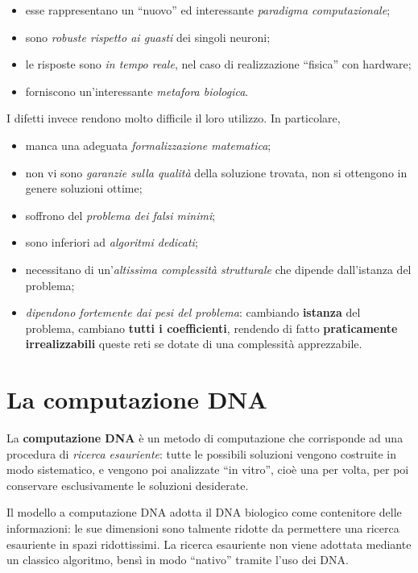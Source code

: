 \documentclass[10pt]{book}
\begin{document}
\begin{itemize}
    \item esse rappresentano un ``nuovo'' ed interessante \emph{paradigma
        computazionale};
    \item sono \emph{robuste rispetto ai guasti} dei singoli neuroni;
    \item le risposte sono \emph{in tempo reale}, nel caso di realizzazione ``fisica''
        con hardware;
    \item forniscono un'interessante \emph{metafora biologica}.
\end{itemize}

I difetti invece rendono molto difficile il loro utilizzo. In particolare,
\begin{itemize}
    \item manca una adeguata \emph{formalizzazione matematica};
    \item non vi sono \emph{garanzie sulla qualità} della soluzione trovata,
        non si ottengono in genere soluzioni ottime;
    \item soffrono del \emph{problema dei falsi minimi};
    \item sono inferiori ad \emph{algoritmi dedicati};
    \item necessitano di un'\emph{altissima complessità strutturale} che
        dipende dall'istanza del problema;
    \item \emph{dipendono fortemente dai pesi del problema}: cambiando
        \textbf{istanza} del problema, cambiano \textbf{tutti i coefficienti},
        rendendo di fatto \textbf{praticamente irrealizzabili} queste reti se
        dotate di una complessità apprezzabile.
\end{itemize}


\chapter{La computazione DNA}

La \textbf{computazione DNA} è un metodo di computazione che corrisponde ad una
procedura di \emph{ricerca esauriente}: tutte le possibili soluzioni vengono
costruite in modo sistematico, e vengono poi analizzate ``in vitro'', cioè una
per volta, per poi conservare esclusivamente le soluzioni desiderate.

Il modello a computazione DNA adotta il DNA biologico come contenitore delle
informazioni: le sue dimensioni sono talmente ridotte da permettere una ricerca
esauriente in spazi ridottissimi. La ricerca esauriente non viene adottata
mediante un classico algoritmo, bensì in modo ``nativo'' tramite l'uso dei DNA.
\end{document}
